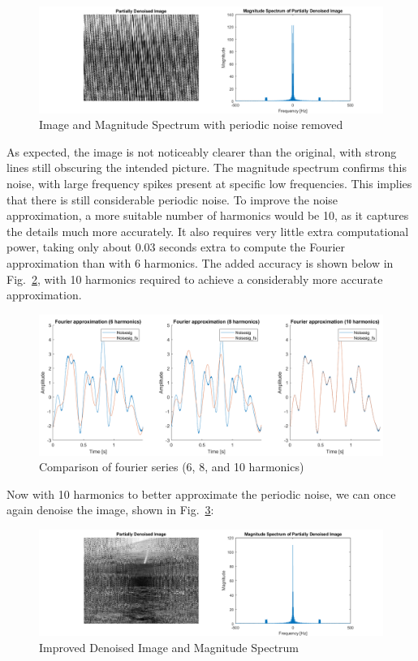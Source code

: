 \documentclass[12pt]{article}
\begin{document}
\begin{figure}[ht]
    \centering
    \includegraphics{figures/p2-im1.png}
    \caption{Image and Magnitude Spectrum with periodic noise removed\label{fig:p2-im1}}
\end{figure}

As expected, the image is not noticeably clearer than the original, with strong
lines still obscuring the intended picture. The magnitude spectrum confirms
this noise, with large frequency spikes present at specific low frequencies.
This implies that there is still considerable periodic noise. To improve the
noise approximation, a more suitable number of harmonics would be 10, as it
captures the details much more accurately. It also requires very little extra
computational power, taking only about 0.03 seconds extra to compute the
Fourier approximation than with 6 harmonics. The added accuracy is shown below
in Fig.~\ref{fig:p2-compharms}, with 10 harmonics required to achieve a
considerably more accurate approximation.

\begin{figure}[ht]
    \centering
    \includegraphics{figures/p2-compharms.png}
    \caption{Comparison of fourier series (6, 8, and 10 harmonics)\label{fig:p2-compharms}}
\end{figure}

Now with 10 harmonics to better approximate the periodic noise, we can once
again denoise the image, shown in Fig.~\ref{fig:p2-im1improved}:

\begin{figure}[ht]
    \centering
    \includegraphics{figures/p2-im1improved.png}
    \caption{Improved Denoised Image and Magnitude Spectrum\label{fig:p2-im1improved}}
\end{figure}
\end{document}
